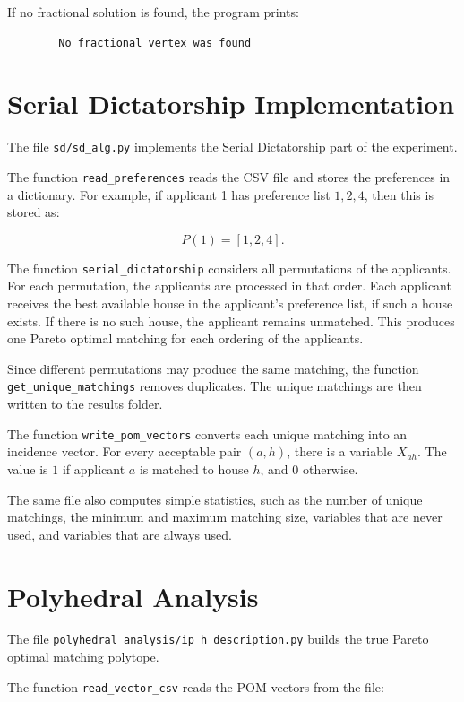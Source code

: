 \documentclass[12pt]{report}
\numberwithin{algorithm}{chapter}
\begin{document}
	If no fractional solution is found, the program prints:
	
	\begin{verbatim}
		No fractional vertex was found
	\end{verbatim}
	
	\section{Serial Dictatorship Implementation}
	
	The file \texttt{sd/sd\_alg.py} implements the Serial Dictatorship part of the experiment.
	
	The function \texttt{read\_preferences} reads the CSV file and stores the preferences in a dictionary. For example, if applicant 1 has preference list \(1,2,4\), then this is stored as:
	
	\[
	P(1) = [1,2,4].
	\]
	
	The function \texttt{serial\_dictatorship} considers all permutations of the applicants. For each permutation, the applicants are processed in that order. Each applicant receives the best available house in the applicant's preference list, if such a house exists. If there is no such house, the applicant remains unmatched. This produces one Pareto optimal matching for each ordering of the applicants.
	
	Since different permutations may produce the same matching, the function \texttt{get\_unique\_matchings} removes duplicates. The unique matchings are then written to the results folder.
	
	The function \texttt{write\_pom\_vectors} converts each unique matching into an incidence vector. For every acceptable pair $(a,h)$, there is a variable $X_{ah}$. The value is $1$ if applicant $a$ is matched to house $h$, and 0 otherwise.
	
	The same file also computes simple statistics, such as the number of unique matchings, the minimum and maximum matching size, variables that are never used, and variables that are always used.
	
	\section{Polyhedral Analysis}
	
	The file \texttt{polyhedral\_analysis/ip\_h\_description.py} builds the true Pareto optimal matching polytope.
	
	The function \texttt{read\_vector\_csv} reads the POM vectors from the file:
	
\end{document}
